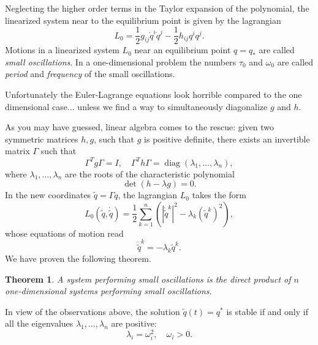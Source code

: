 \documentclass[english,fontsize=11pt,paper=a5,oneside]{scrbook}
\newcommand{\R}{\mathbb{R}}
\DeclareMathOperator{\diag}{diag}
\newtheorem{theorem}{Theorem}[chapter]
\theoremstyle{definition}
\begin{document}
Neglecting the higher order terms in the Taylor expansion of the polynomial, the linearized system near to the equilibrium point is given by the lagrangian \cite[Chapter 22.D]{book:arnold}
\begin{equation}\label{eq:genlagso}
    L_0 = \frac12 g_{ij} \dot q^i \dot q^j - \frac12 h_{ij} q^i q^j. 
\end{equation}
Motions in a linearized system $L_0$ near an equilibrium point $q =q_*$ are called \emph{small oscillations}. In a one-dimensional problem the numbers $\tau_0$ and $\omega_0$ are called \emph{period} and \emph{frequency} of the small oscillations.

Unfortunately the Euler-Lagrange equations look horrible compared to the one dimensional case... unless we find a way to simultaneously diagonalize $g$ and $h$.

As you may have guessed, linear algebra comes to the rescue: given two symmetric matrices $h,g$, such that $g$ is positive definite, there exists an invertible matrix $\Gamma$ such that
\begin{equation}
    \Gamma^T g \Gamma = I, \quad \Gamma^T h \Gamma = \diag(\lambda_1, \ldots, \lambda_n),
\end{equation}
where $\lambda_1, \ldots, \lambda_n$ are the roots of the characteristic polynomial \cite[Chapter 23.A]{book:arnold}
\begin{equation}\label{eq:charso}
    \det(h - \lambda g) = 0.
\end{equation}
In the new coordinates $\tilde q = \Gamma q$, the lagrangian $L_0$ takes the form
\begin{equation}
    L_0(\tilde q, \dot{\tilde q}) = \frac12 \sum_{k=1}^n \left(\left|\dot{\tilde q}^k\right|^2 - \lambda_k (\tilde q^k)^2 \right),
\end{equation}
whose equations of motion read
\begin{equation}
    \ddot {\tilde q}^k = -\lambda_k \tilde q^k.
\end{equation}
We have proven the following theorem.
\begin{theorem}
    A system performing small oscillations is the direct product of $n$ one-dimensional systems performing small oscillations.
\end{theorem}

In view of the observations above, the solution $\tilde q(t) = q^*$ is stable if and only if all the eigenvalues $\lambda_1, \ldots, \lambda_n$ are positive:
\begin{equation}
    \lambda_i = \omega_i^2, \quad \omega_i > 0.
\end{equation}
\end{document}
